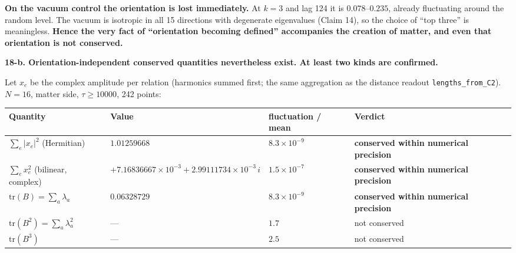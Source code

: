 \documentclass[
  10pt,
]{article}
\newcounter{none} %
\begin{document}
\textbf{On the vacuum control the orientation is lost immediately.} At
\(k=3\) and lag 124 it is \(0.078\)--\(0.235\), already fluctuating
around the random level. The vacuum is isotropic in all 15 directions
with degenerate eigenvalues (Claim 14), so the choice of ``top three''
is meaningless. \textbf{Hence the very fact of ``orientation becoming
defined'' accompanies the creation of matter, and even that orientation
is not conserved.}

\textbf{18-b. Orientation-independent conserved quantities nevertheless
exist. At least two kinds are confirmed.}

Let \(x_e\) be the complex amplitude per relation (harmonics summed
first; the same aggregation as the distance readout
\texttt{lengths\_from\_C2}). \(N=16\), matter side, \(\tau\ge10000\),
242 points:

{\def\LTcaptype{none} %
\begin{longtable}[]{@{}
  >{\raggedright\arraybackslash}p{}
  >{\raggedright\arraybackslash}p{}
  >{\raggedright\arraybackslash}p{}
  >{\raggedright\arraybackslash}p{}@{}}
\toprule\noalign{}
\begin{minipage}[b]{\linewidth}\raggedright
Quantity
\end{minipage} & \begin{minipage}[b]{\linewidth}\raggedright
Value
\end{minipage} & \begin{minipage}[b]{\linewidth}\raggedright
fluctuation / mean
\end{minipage} & \begin{minipage}[b]{\linewidth}\raggedright
Verdict
\end{minipage} \\
\midrule\noalign{}
\endhead
\bottomrule\noalign{}
\endlastfoot
\(\sum_e\lvert x_e\rvert^2\) (Hermitian) & \(1.01259668\) &
\(8.3\times10^{-9}\) & \textbf{conserved within numerical precision} \\
\(\sum_e x_e^2\) (bilinear, complex) &
\(+7.16836667\times10^{-3} + 2.99111734\times10^{-3}\,i\) &
\(1.5\times10^{-7}\) & \textbf{conserved within numerical precision} \\
\(\mathrm{tr}(B) = \sum_a\lambda_a\) & \(0.06328729\) &
\(8.3\times10^{-9}\) & \textbf{conserved within numerical precision} \\
\(\mathrm{tr}(B^2) = \sum_a\lambda_a^2\) & --- & \(1.7\) & not
conserved \\
\(\mathrm{tr}(B^3)\) & --- & \(2.5\) & not conserved \\
\end{longtable}
}
\end{document}

